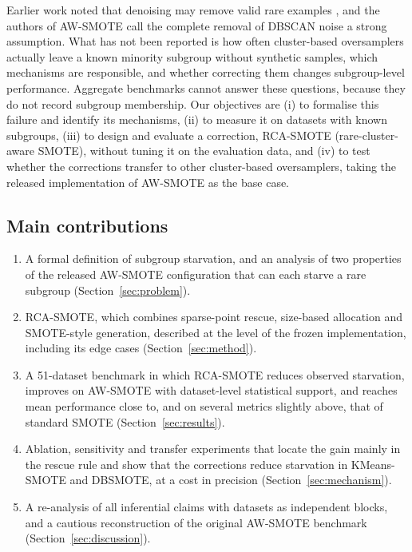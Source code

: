 \documentclass[preprint,nopreprintline]{elsarticle}
\theoremstyle{plain}
\theoremstyle{definition}
\begin{document}
Earlier work noted that denoising may remove valid rare examples \cite{napierala2016types}, and the authors of AW-SMOTE \cite{yan2026awsmote} call the complete removal of DBSCAN noise a strong assumption. What has not been reported is how often cluster-based oversamplers actually leave a known minority subgroup without synthetic samples, which mechanisms are responsible, and whether correcting them changes subgroup-level performance. Aggregate benchmarks cannot answer these questions, because they do not record subgroup membership. Our objectives are (i) to formalise this failure and identify its mechanisms, (ii) to measure it on datasets with known subgroups, (iii) to design and evaluate a correction, RCA-SMOTE (rare-cluster-aware SMOTE), without tuning it on the evaluation data, and (iv) to test whether the corrections transfer to other cluster-based oversamplers, taking the released implementation of AW-SMOTE \cite{yan2026awsmote} as the base case.

\subsection{Main contributions}\label{sec:contrib}

\begin{enumerate}
\item A formal definition of subgroup starvation, and an analysis of two properties of the released AW-SMOTE configuration that can each starve a rare subgroup (Section~\ref{sec:problem}).
\item RCA-SMOTE, which combines sparse-point rescue, size-based allocation and SMOTE-style generation, described at the level of the frozen implementation, including its edge cases (Section~\ref{sec:method}).
\item A 51-dataset benchmark in which RCA-SMOTE reduces observed starvation, improves on AW-SMOTE with dataset-level statistical support, and reaches mean performance close to, and on several metrics slightly above, that of standard SMOTE (Section~\ref{sec:results}).
\item Ablation, sensitivity and transfer experiments that locate the gain mainly in the rescue rule and show that the corrections reduce starvation in KMeans-SMOTE and DBSMOTE, at a cost in precision (Section~\ref{sec:mechanism}).
\item A re-analysis of all inferential claims with datasets as independent blocks, and a cautious reconstruction of the original AW-SMOTE benchmark (Section~\ref{sec:discussion}).
\end{enumerate}
\end{document}
